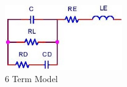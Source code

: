 \begin{figure}[ht!]
\includegraphics[keepaspectratio=true,width=2in]{./figures/regression/fullModel.jpg}
\centering
\caption{6 Term Model}
\label{fig:fullModel}
\end{figure}
